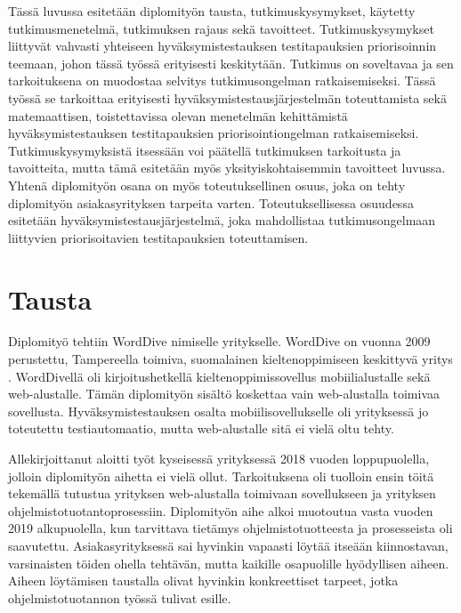 Tässä luvussa esitetään diplomityön tausta, tutkimuskysymykset, käytetty tutkimusmenetelmä, tutkimuksen rajaus sekä tavoitteet.
Tutkimuskysymykset liittyvät vahvasti yhteiseen hyväksymistestauksen testitapauksien priorisoinnin teemaan, johon tässä työssä erityisesti keskitytään.
Tutkimus on soveltavaa ja sen tarkoituksena on muodostaa selvitys tutkimusongelman ratkaisemiseksi.
Tässä työssä se tarkoittaa erityisesti hyväksymistestausjärjestelmän toteuttamista sekä matemaattisen, toistettavissa olevan menetelmän kehittämistä hyväksymistestauksen testitapauksien priorisointiongelman ratkaisemiseksi.
Tutkimuskysymyksistä itsessään voi päätellä tutkimuksen tarkoitusta ja tavoitteita, mutta tämä esitetään myös yksityiskohtaisemmin tavoitteet luvussa.
Yhtenä diplomityön osana on myös toteutuksellinen osuus, joka on tehty diplomityön asiakasyrityksen tarpeita varten.
Toteutuksellisessa osuudessa esitetään hyväksymistestausjärjestelmä, joka mahdollistaa tutkimusongelmaan liittyvien priorisoitavien testitapauksien toteuttamisen.

\section{Tausta} \label{ch:06_tausta}

  Diplomityö tehtiin WordDive nimiselle yritykselle. WordDive on vuonna 2009 perustettu, Tampereella toimiva, suomalainen kieltenoppimiseen keskittyvä yritys \parencite{worddive_details}.
  WordDivellä oli kirjoitushetkellä kieltenoppimissovellus mobiilialustalle sekä web-alustalle.
  Tämän diplomityön sisältö koskettaa vain web-alustalla toimivaa sovellusta.
  Hyväksymistestauksen osalta mobiilisovellukselle oli yrityksessä jo toteutettu testiautomaatio, mutta web-alustalle sitä ei vielä oltu tehty.

  Allekirjoittanut aloitti työt kyseisessä yrityksessä 2018 vuoden loppupuolella, jolloin diplomityön aihetta ei vielä ollut.
  Tarkoituksena oli tuolloin ensin töitä tekemällä tutustua yrityksen web-alustalla toimivaan sovellukseen ja yrityksen ohjelmistotuotantoprosessiin.
  Diplomityön aihe alkoi muotoutua vasta vuoden 2019 alkupuolella, kun tarvittava tietämys ohjelmistotuotteesta ja prosesseista oli saavutettu.
  Asiakasyrityksessä sai hyvinkin vapaasti löytää itseään kiinnostavan, varsinaisten töiden ohella tehtävän, mutta kaikille osapuolille hyödyllisen aiheen.
  Aiheen löytämisen taustalla olivat hyvinkin konkreettiset tarpeet, jotka ohjelmistotuotannon työssä tulivat esille.

